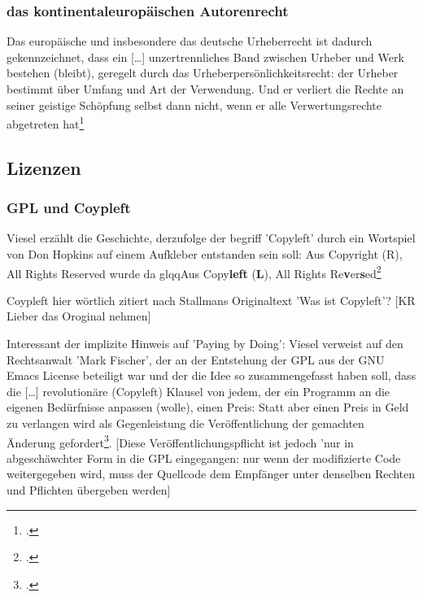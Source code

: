 \documentclass[DIV=calc,BCOR=5mm,11pt,headings=small,oneside,abstract=true, toc=bib]{scrartcl}
\begin{document}
\subsubsection{das kontinentaleuropäischen Autorenrecht}

Das europäische und insbesondere das deutsche Urheberrecht ist dadurch
gekennzeichnet, dass ein \glqq{}[\ldots] unzertrennliches Band zwischen Urheber
und Werk bestehen (bleibt)\grqq{}, geregelt durch das
\glqq{}Urheberpersönlichkeitsrecht\grqq{}: der Urheber bestimmt über Umfang und
Art der Verwendung. Und er verliert die Rechte \glqq{}an seiner geistige
Schöpfung\grqq{} selbst dann nicht, wenn er alle Verwertungsrechte abgetreten
hat\footcite[vgl.][48]{Viesel2006a}

\subsection{Lizenzen}

\subsubsection{GPL und Coypleft}

Viesel erzählt die Geschichte, derzufolge der begriff 'Copyleft' durch ein
Wortspiel von Don Hopkins auf einem Aufkleber entstanden sein soll: \glqq{}Aus
Copyright (R), All Rights Reserved\grqq{} wurde da glqq{}Aus
Copy\textbf{left} (\textbf{L}), All Rights
Re\textbf{v}er\textbf{s}ed\grqq{}\footcite[vgl.][60]{Viesel2006a}

Coypleft hier wörtlich zitiert nach Stallmans Originaltext 'Was ist Copyleft'?
[KR Lieber das Oroginal nehmen]

Interessant der implizite Hinweis auf 'Paying by Doing': Viesel verweist auf den
Rechtsanwalt 'Mark Fischer', der an der Entstehung der GPL aus der GNU Emacs
License beteiligt war und der die Idee so zusammengefasst haben soll, dass die
\glqq{}[\ldots] revolutionäre (Copyleft) Klausel von jedem, der ein Programm an
die eigenen Bedürfnisse anpassen (wolle), einen Preis\grqq{}: \glqq{}Statt aber
einen Preis in Geld zu verlangen wird als Gegenleistung die Veröffentlichung der
gemachten Änderung gefordert\grqq{}\grqq{}\footcite[vgl.][61]{Viesel2006a}.
[Diese Veröffentlichungspflicht ist jedoch 'nur in abgeschäwchter Form in die
GPL eingegangen: nur wenn der modifizierte Code weitergegeben wird, muss der
Quellcode dem Empfänger unter denselben Rechten und Pflichten übergeben werden]
\end{document}
